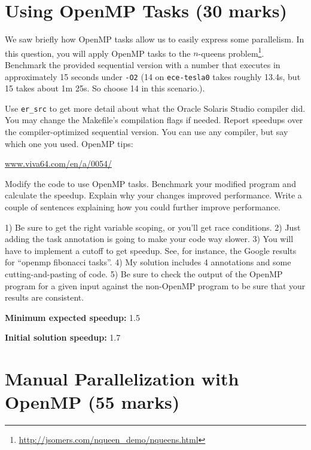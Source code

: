 \documentclass[letterpaper,10pt]{article}
\begin{document}
\section{Using OpenMP Tasks (30 marks)}

We saw briefly how OpenMP tasks allow us to easily express some parallelism.
In this question, you will apply OpenMP tasks to the $n$-queens
problem\footnote{\url{http://jsomers.com/nqueen_demo/nqueens.html}}.
Benchmark the provided sequential version with a number that executes in approximately
15 seconds under {\tt -O2} (14 on {\tt ece-tesla0} takes roughly 13.4s, but 15 takes about 1m 25s. 
So choose 14 in this scenario.).

 Use {\tt er\_src} to get more detail about what the Oracle
Solaris Studio compiler did.  You may change the
Makefile's compilation flags if needed. Report speedups over the
compiler-optimized sequential version.  You can use any compiler, but
say which one you used. OpenMP tips:
\begin{center}
  \url{www.viva64.com/en/a/0054/}
\end{center}

Modify the code to use OpenMP tasks. Benchmark your modified program
and calculate the speedup. Explain why your
changes improved performance. Write a couple of sentences explaining how
you could further improve performance.

\vspace*{1em}
 1) Be sure to get the right variable scoping, or
you'll get race conditions. 2) Just adding the task annotation is going
to make your code way slower. 3) You will have to implement a cutoff to
get speedup. See, for instance, the Google results for ``openmp
fibonacci tasks''. 4) My solution includes 4 annotations and some
cutting-and-pasting of code. 5) Be sure to check the output of the
OpenMP program for a given input against the non-OpenMP program to be
sure that your results are consistent.

\squishlist
  \item {\bf Minimum expected speedup:} 1.5
  \item {\bf Initial solution speedup:} 1.7
\squishend

\newpage

\section{Manual Parallelization with OpenMP (55 marks)}
\end{document}
